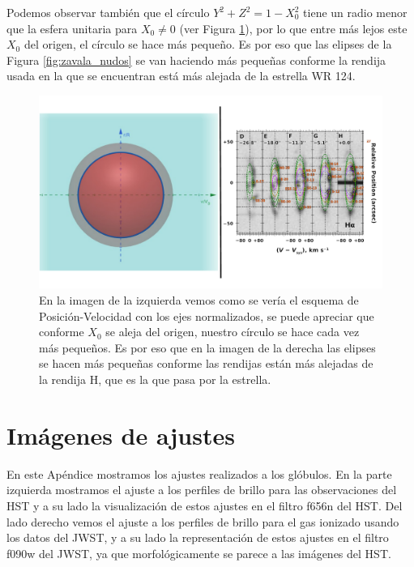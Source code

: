 \documentclass{book}
\begin{document}
Podemos observar también que el círculo $Y^2+Z^2=1-X_0^2$ tiene un radio menor que la esfera unitaria  para $X_0\neq0$ (ver Figura \ref{fig: ap PV modelo}), por lo que entre más lejos este $X_0$ del origen, el círculo se hace más pequeño. Es por eso que las elipses de la Figura \ref{fig:zavala_nudos} se van haciendo más pequeñas conforme la rendija usada en la que se encuentran está más alejada de la estrella WR 124. 


\begin{figure}
    \centering
    \includegraphics[width=\textwidth]{imagenes_corregidas/n_esfe_03.pdf}
    \caption{En la imagen de la izquierda vemos como se vería el esquema de Posición-Velocidad con los ejes normalizados, se puede apreciar que conforme $X_0$ se aleja del origen, nuestro círculo se hace cada vez más pequeños. Es por eso que en la imagen de la derecha las elipses se hacen más pequeñas conforme las rendijas están más alejadas de la rendija H, que es la que pasa por la estrella. }
    \label{fig: ap PV modelo}
\end{figure}


\chapter{Imágenes de ajustes}\label{App : ajustes}

En este Apéndice mostramos los ajustes realizados a los glóbulos. En la parte izquierda mostramos el ajuste a los perfiles de brillo para las observaciones del HST y a su lado la visualización de estos ajustes en el filtro f656n del HST. Del lado derecho vemos el ajuste a los perfiles de brillo para el gas ionizado usando los datos del JWST, y a su lado la representación de estos ajustes en el filtro f090w del JWST, ya que morfológicamente se parece a las imágenes del HST.
\end{document}

